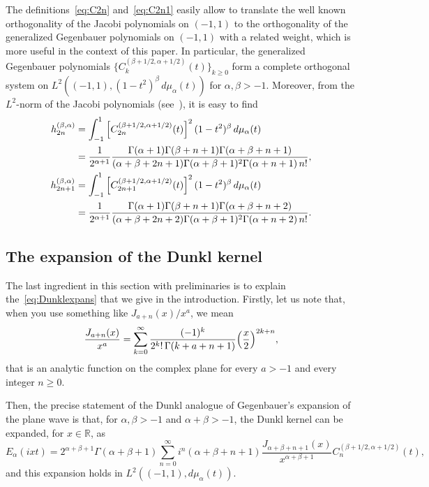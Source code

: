 \documentclass[12pt,a4paper]{amsart}
\theoremstyle{plain}
\theoremstyle{definition}
\newcommand{\R}{\mathbb{R}}
\begin{document}
The definitions~\eqref{eq:C2n} and~\eqref{eq:C2n1} easily allow to translate the 
well known orthogonality of the Jacobi polynomials on $(-1,1)$ to the orthogonality 
of the generalized Gegenbauer polynomials on $(-1,1)$ with a related weight, 
which is more useful in the context of this paper.
In particular, the generalized Gegenbauer polynomials 
$\{C_{k}^{(\beta+1/2,\alpha+1/2)}(t)\}_{k\ge0}$ form a complete 
orthogonal system on $L^2((-1,1),(1-t^2)^\beta \,d\mu_\alpha(t))$ 
for $\alpha,\beta>-1$.
Moreover, from the $L^2$-norm of the Jacobi polynomials
(see~\cite[formula 22.2.1, p.~774]{AbSt}),
it is easy to find
\begin{align}
\label{eq:hC2n}
  h_{2n}^{(\beta,\alpha)}
  &= \int_{-1}^1 \left[C_{2n}^{(\beta+1/2,\alpha+1/2)}(t)\right]^2
  (1-t^2)^\beta \,d\mu_\alpha(t) \\
  &= \frac{1}{2^{\alpha+1}} \frac{\Gamma(\alpha+1)\Gamma(\beta+n+1)\Gamma(\alpha+\beta+n+1)}
    {(\alpha+\beta+2n+1)\Gamma(\alpha+\beta+1)^2 \Gamma(\alpha+n+1)\, n!},
  \notag \\
\label{eq:hC2n1}
  h_{2n+1}^{(\beta,\alpha)}
  &= \int_{-1}^1 \left[C_{2n+1}^{(\beta+1/2,\alpha+1/2)}(t)\right]^2
  (1-t^2)^\beta \,d\mu_\alpha(t) \\
  &= \frac{1}{2^{\alpha+1}} \frac{\Gamma(\alpha+1)\Gamma(\beta+n+1)\Gamma(\alpha+\beta+n+2)}
    {(\alpha+\beta+2n+2) \Gamma(\alpha+\beta+1)^2 \Gamma(\alpha+n+2)\, n!}.
\notag
\end{align}

\subsection{The expansion of the Dunkl kernel}

The last ingredient in this section with preliminaries is to explain 
the~\eqref{eq:Dunklexpans} that we give in the introduction. 
Firstly, let us note that, when you use something like ${J_{a+n}(x)}/{x^a}$, we mean
\[
  \frac{J_{a+n}(x)}{x^a}
  = \sum_{k=0}^\infty \frac{(-1)^k}{2^ k!\,\Gamma(k+a+n+1)}
  \Bigl(\frac{x}{2}\Bigr)^{2k+n},
\]
that is an analytic function on the complex plane for every $a>-1$ 
and every integer $n \ge 0$.

Then, the precise statement of the Dunkl analogue of Gegenbauer's 
expansion of the plane wave is that, for $\alpha,\beta > -1$ and $\alpha+\beta>-1$, 
the Dunkl kernel can be expanded, for $x\in \R$, as
\begin{equation}
\label{eq:JA-Dunkl}
  E_\alpha(ixt) = 2^{\alpha+\beta+1} \Gamma(\alpha+\beta+1)
  \sum_{n = 0}^{\infty} i^{n}(\alpha+\beta+n+1)
  \frac{J_{\alpha+\beta+n+1}(x)}{x^{\alpha+\beta+1}} C_{n}^{(\beta+1/2,\alpha+1/2)}(t),
\end{equation}
and this expansion holds in $L^{2}((-1,1),d\mu_{\alpha}(t))$.
\end{document}
